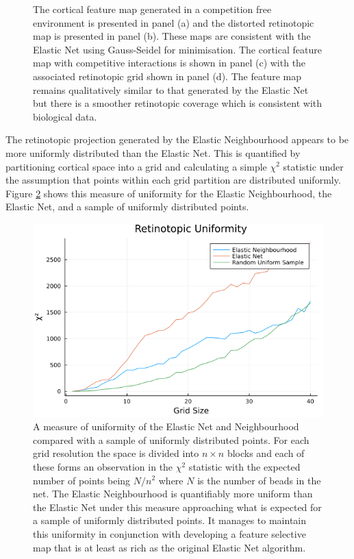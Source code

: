 \begin{figure}
\begin{subfigure}{0.5\textwidth}
		\caption{}
	\end{subfigure}
	\def\c{The cortical feature and retinotopic maps generated in a competition free and competitive environments are presented.}
	\caption[\c]{\label{fig:endistortedretinotopy} The cortical feature map generated in a competition free environment is presented in panel (a) and the distorted retinotopic map is presented in panel (b). These maps are consistent with the Elastic Net using Gauss-Seidel for minimisation. The cortical feature map with competitive interactions is shown in panel (c) with the associated retinotopic grid shown in panel (d). The feature map remains qualitatively similar to that generated by the Elastic Net but there is a smoother retinotopic coverage which is consistent with biological data.}
\end{figure}
The retinotopic projection generated by the Elastic Neighbourhood appears to be more uniformly distributed than the Elastic Net. This is quantified by partitioning cortical space into a grid and calculating a simple $\chi^2$ statistic under the assumption that points within each grid partition are distributed uniformly. Figure \ref{fig:chi2statistics} shows this measure of uniformity for the Elastic Neighbourhood, the Elastic Net, and a sample of uniformly distributed points.

\begin{figure}
	\centering
	\includegraphics[width=\textwidth]{images/elastic_neighbourhood/fig_chi2_statistics_uniform}
	\def\c{A measure of uniformity of the Elastic Net and Neighbourhood compared with a sample of uniformly distributed points. }
	\caption[\c]{\label{fig:chi2statistics} \c For each grid resolution the space is divided into $n\times n$ blocks and each of these forms an observation in the $\chi^2$ statistic with the expected number of points being $N/n^2$ where $N$ is the number of beads in the net. The Elastic Neighbourhood is quantifiably more uniform than the Elastic Net under this measure approaching what is expected for a sample of uniformly distributed points. It manages to maintain this uniformity in conjunction with developing a feature selective map that is at least as rich as the original Elastic Net algorithm.}
\end{figure}

